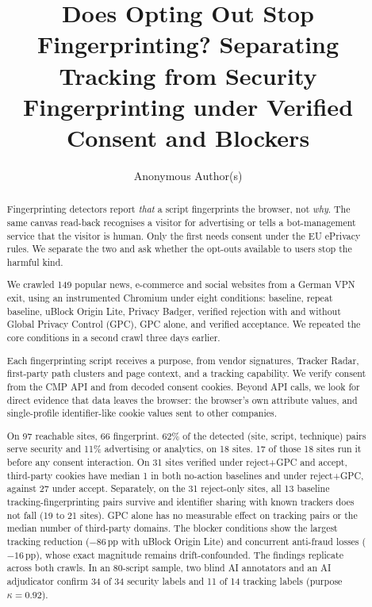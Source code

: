 \documentclass[sigconf,review,anonymous]{acmart}
\newcommand{\pp}{\,pp}
\begin{document}
\title{Does Opting Out Stop Fingerprinting? Separating Tracking from Security Fingerprinting under Verified Consent and Blockers}

\author{Anonymous Author(s)}

\begin{abstract}
Fingerprinting detectors report \emph{that} a script fingerprints the browser, not \emph{why}.
The same canvas read-back recognises a visitor for advertising or tells a bot-management
service that the visitor is human. Only the first needs consent under the EU ePrivacy rules.
We separate the two and ask whether the opt-outs available to users stop the harmful kind.

We crawled 149 popular news, e-commerce and social websites from a German VPN exit, using an
instrumented Chromium under eight conditions:
baseline, repeat baseline, uBlock Origin Lite, Privacy Badger, verified rejection with and
without Global Privacy Control (GPC), GPC alone, and verified acceptance. We repeated the core
conditions in a second crawl three days earlier.

Each fingerprinting script receives a purpose, from vendor signatures, Tracker Radar,
first-party path clusters and page context, and a tracking capability. We verify consent from
the CMP API and from decoded consent cookies. Beyond API calls, we look for direct evidence that
data leaves the browser: the browser's own attribute values, and single-profile identifier-like
cookie values sent to other companies.

On 97 reachable sites, 66 fingerprint. 62\% of the detected (site, script, technique) pairs
serve security and 11\% advertising or analytics, on 18 sites. 17 of those 18 sites run it
before any consent interaction. On 31 sites verified under reject+GPC and accept, third-party
cookies have median 1 in both no-action baselines and under reject+GPC, against 27 under accept.
Separately, on the 31 reject-only sites, all 13 baseline tracking-fingerprinting pairs survive
and identifier sharing with known trackers does not fall (19 to 21 sites). GPC alone has no measurable effect on
tracking pairs or the median number of third-party domains.
The blocker conditions show the largest tracking reduction ($-86$\pp{} with uBlock Origin Lite)
and concurrent anti-fraud losses ($-16$\pp{}), whose exact magnitude remains drift-confounded.
The findings replicate across
both crawls. In an 80-script sample, two blind AI annotators and an AI adjudicator confirm 34 of 34 security labels and
11 of 14 tracking labels (purpose $\kappa=0.92$).
\end{abstract}
\end{document}
